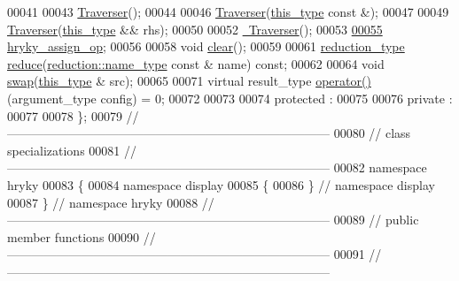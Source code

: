 \begin{DoxyCode}
00041 
00043     \hyperlink{classhryky_1_1display_1_1_traverser_a6ea76dfd47de0a8baf0eb9855d6dc069}{Traverser}();
00044 
00046     \hyperlink{classhryky_1_1display_1_1_traverser_a6ea76dfd47de0a8baf0eb9855d6dc069}{Traverser}(\hyperlink{classhryky_1_1display_1_1_traverser}{this_type} \textcolor{keyword}{const} &);
00047 
00049     \hyperlink{classhryky_1_1display_1_1_traverser_a6ea76dfd47de0a8baf0eb9855d6dc069}{Traverser}(\hyperlink{classhryky_1_1display_1_1_traverser}{this_type} && rhs);
00050 
00052     \hyperlink{classhryky_1_1display_1_1_traverser_a652ce240d436375ce190527c30351e61}{~Traverser}();
00053 
\hypertarget{display__traverser_8h_source_l00055}{}\hyperlink{classhryky_1_1display_1_1_traverser_af60b72f550a1d60839a5a5e3851b6f73}{00055}     \hyperlink{classhryky_1_1display_1_1_traverser_af60b72f550a1d60839a5a5e3851b6f73}{hryky_assign_op};
00056 
00058     \textcolor{keywordtype}{void} \hyperlink{classhryky_1_1display_1_1_traverser_acb0875c02060747ef7407663c1dba492}{clear}();
00059 
00061     \hyperlink{classhryky_1_1_intrusive_ptr}{reduction_type} \hyperlink{classhryky_1_1display_1_1_traverser_a11a530ae46d01adeba0c92c0ef45d83b}{reduce}(\hyperlink{classhryky_1_1reduction_1_1_string}{reduction::name_type} \textcolor{keyword}{const} & name) \textcolor{keyword}{const};
00062 
00064     \textcolor{keywordtype}{void} \hyperlink{classhryky_1_1display_1_1_traverser_a6e618d472947eb171c5ce80af4c55dc2}{swap}(\hyperlink{classhryky_1_1display_1_1_traverser}{this_type} & src);
00065 
00071     \textcolor{keyword}{virtual} result\_type \hyperlink{classhryky_1_1display_1_1_traverser_aea08c97fa5b3aea2f2173b7aeef1044a}{operator()}(argument\_type config) = 0;
00072 
00073 
00074 \textcolor{keyword}{protected} :
00075 
00076 \textcolor{keyword}{private} :
00077 
00078 \};
00079 \textcolor{comment}{//
      ------------------------------------------------------------------------------}
00080 \textcolor{comment}{// class specializations}
00081 \textcolor{comment}{//
      ------------------------------------------------------------------------------}
00082 \textcolor{keyword}{namespace }hryky
00083 \{
00084 \textcolor{keyword}{namespace }display
00085 \{
00086 \} \textcolor{comment}{// namespace display}
00087 \} \textcolor{comment}{// namespace hryky}
00088 \textcolor{comment}{//
      ------------------------------------------------------------------------------}
00089 \textcolor{comment}{// public member functions}
00090 \textcolor{comment}{//
      ------------------------------------------------------------------------------}
00091 \textcolor{comment}{//
      ------------------------------------------------------------------------------}

\end{DoxyCode}
